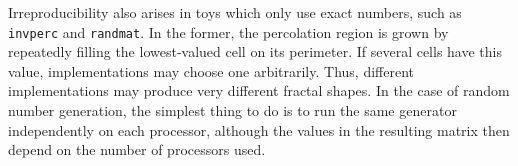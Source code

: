 Irreproducibility also arises in toys which only use exact numbers, such as {\tt{invperc}} and {\tt{randmat}}.
In the former, the percolation region is grown by repeatedly filling the lowest-valued cell on its perimeter.
If several cells have this value, implementations may choose one arbitrarily.
Thus, different implementations may produce very different fractal shapes.
In the case of random number generation, the simplest thing to do is to run the same generator independently on each processor,
although the values in the resulting matrix then depend on the number of processors used.
